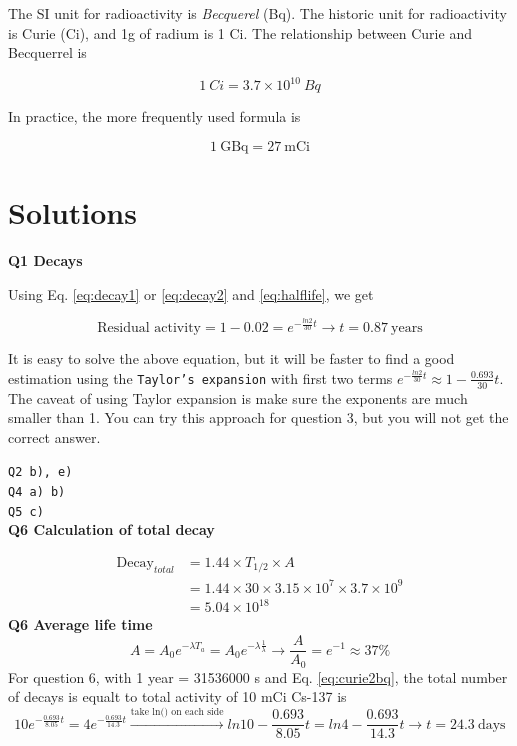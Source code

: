 \documentclass[]{book}
\theoremstyle{definition}
\theoremstyle{definition}
\theoremstyle{definition}
\theoremstyle{remark}
\begin{document}
The SI unit for radioactivity is \emph{Becquerel} (Bq). The historic
unit for radioactivity is Curie (Ci), and 1g of radium is 1 Ci. The
relationship between Curie and Becquerrel is

\begin{equation}
 1\ Ci = 3.7 \times 10^{10} \ Bq
 \label{eq:curie2bq}
\end{equation}

In practice, the more frequently used formula is

\begin{equation}
  \boxed {1\ \text{GBq} = 27\ \text{mCi}}
\end{equation}

\section{Solutions}\label{nucl-solution}

\textbf{Q1 Decays}

Using Eq. \eqref{eq:decay1} or \eqref{eq:decay2} and \eqref{eq:halflife}, we
get

\[
\text{Residual activity} = 1-0.02 = e^{-\frac{ln2}{30}t} \rightarrow \boxed{t =0.87\ \text{years}}
\]

It is easy to solve the above equation, but it will be faster to find a
good estimation using the \texttt{Taylor’s\ expansion} with first two
terms \(e^{-\frac{ln2}{30}t} \approx 1-\frac{0.693}{30}t\). The caveat
of using Taylor expansion is make sure the exponents are much smaller
than 1. You can try this approach for question 3, but you will not get
the correct answer.

\texttt{Q2\ b),\ e)}\\
\texttt{Q4\ a)\ b)}\\
\texttt{Q5\ c)}\\
\textbf{Q6 Calculation of total decay}

\[
\begin{aligned}
\text{Decay}_{total} &= 1.44 \times T_{1/2} \times {A} \\
    &= 1.44 \times 30 \times 3.15\times 10^7 \times 3.7\times 10^9 \\
    &= \boxed{5.04\times 10^{18}}
\end{aligned}
\] \textbf{Q6 Average life time} \[
A=A_0e^{-\lambda T_a}=A_0e^{-\lambda \frac{1}{\lambda}}\rightarrow \frac{A}{A_0}=e^{-1} \approx \boxed{37\%}
\] For question 6, with 1 year = 31536000 s and Eq. \eqref{eq:curie2bq},
the total number of decays is equalt to total activity of 10 mCi Cs-137
is \[
10e^{-\frac{0.693}{8.05}t} = 4e^{-\frac{0.693}{14.3}t} \xrightarrow{\text{take ln() on each side}}
  ln10-\frac{0.693}{8.05}t = ln4 -\frac{0.693}{14.3}t \rightarrow t = \boxed{24.3\ \text{days}}
\]
\end{document}
